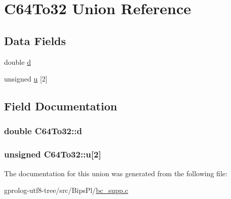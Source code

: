 \hypertarget{unionC64To32}{}\section{C64\+To32 Union Reference}
\label{unionC64To32}
\subsection*{Data Fields}
\begin{DoxyCompactItemize}
\item 
double \hyperlink{unionC64To32_a153fec5a65f5557d9e40a57b95ae6dc0}{d}
\item 
unsigned \hyperlink{unionC64To32_aa82ad59db4f982b9779320862ef7f50f}{u} \mbox{[}2\mbox{]}
\end{DoxyCompactItemize}


\subsection{Field Documentation}
\subsubsection[{\texorpdfstring{d}{d}}]{\setlength{\rightskip}{0pt plus 5cm}double C64\+To32\+::d}\hypertarget{unionC64To32_a153fec5a65f5557d9e40a57b95ae6dc0}{}\label{unionC64To32_a153fec5a65f5557d9e40a57b95ae6dc0}
\subsubsection[{\texorpdfstring{u}{u}}]{\setlength{\rightskip}{0pt plus 5cm}unsigned C64\+To32\+::u\mbox{[}2\mbox{]}}\hypertarget{unionC64To32_aa82ad59db4f982b9779320862ef7f50f}{}\label{unionC64To32_aa82ad59db4f982b9779320862ef7f50f}


The documentation for this union was generated from the following file\+:\begin{DoxyCompactItemize}
\item 
gprolog-\/utf8-\/tree/src/\+Bips\+Pl/\hyperlink{bc__supp_8c}{bc\+\_\+supp.\+c}\end{DoxyCompactItemize}
